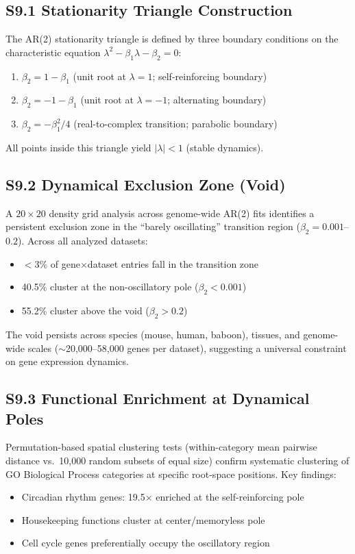 \documentclass[11pt,a4paper]{article}
\begin{document}
\subsection{S9.1 Stationarity Triangle Construction}

The AR(2) stationarity triangle is defined by three boundary conditions on the characteristic equation $\lambda^2 - \beta_1\lambda - \beta_2 = 0$:
\begin{enumerate}
    \item $\beta_2 = 1 - \beta_1$ (unit root at $\lambda = 1$; self-reinforcing boundary)
    \item $\beta_2 = -1 - \beta_1$ (unit root at $\lambda = -1$; alternating boundary)
    \item $\beta_2 = -\beta_1^2/4$ (real-to-complex transition; parabolic boundary)
\end{enumerate}

All points inside this triangle yield $|\lambda| < 1$ (stable dynamics).

\subsection{S9.2 Dynamical Exclusion Zone (Void)}

A $20 \times 20$ density grid analysis across genome-wide AR(2) fits identifies a persistent exclusion zone in the ``barely oscillating'' transition region ($\beta_2 = 0.001$--$0.2$). Across all analyzed datasets:
\begin{itemize}
    \item $<$3\% of gene$\times$dataset entries fall in the transition zone
    \item 40.5\% cluster at the non-oscillatory pole ($\beta_2 < 0.001$)
    \item 55.2\% cluster above the void ($\beta_2 > 0.2$)
\end{itemize}

The void persists across species (mouse, human, baboon), tissues, and genome-wide scales ($\sim$20,000--58,000 genes per dataset), suggesting a universal constraint on gene expression dynamics.

\subsection{S9.3 Functional Enrichment at Dynamical Poles}

Permutation-based spatial clustering tests (within-category mean pairwise distance vs.\ 10,000 random subsets of equal size) confirm systematic clustering of GO Biological Process categories at specific root-space positions. Key findings:
\begin{itemize}
    \item Circadian rhythm genes: 19.5$\times$ enriched at the self-reinforcing pole
    \item Housekeeping functions cluster at center/memoryless pole
    \item Cell cycle genes preferentially occupy the oscillatory region
\end{itemize}
\end{document}

